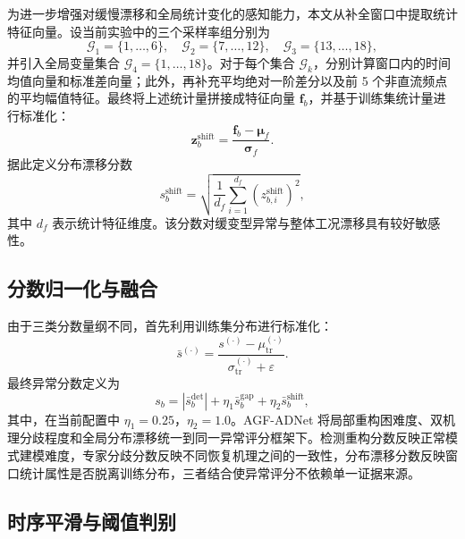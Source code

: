 \documentclass[bachelor, vlined]{DissertUESTC}
\begin{document}
    为进一步增强对缓慢漂移和全局统计变化的感知能力，本文从补全窗口中提取统计特征向量。设当前实验中的三个采样率组分别为
    \begin{equation}
        \mathcal{G}_1=\{1,\ldots,6\},\quad
        \mathcal{G}_2=\{7,\ldots,12\},\quad
        \mathcal{G}_3=\{13,\ldots,18\},
    \end{equation}
    并引入全局变量集合 $\mathcal{G}_4=\{1,\ldots,18\}$。对于每个集合 $\mathcal{G}_k$，分别计算窗口内的时间均值向量和标准差向量；此外，再补充平均绝对一阶差分以及前 5 个非直流频点的平均幅值特征。最终将上述统计量拼接成特征向量 $\mathbf{f}_b$，并基于训练集统计量进行标准化：
    \begin{equation}
        \mathbf{z}_b^{\mathrm{shift}} = \frac{\mathbf{f}_b-\boldsymbol{\mu}_f}{\boldsymbol{\sigma}_f}.
    \end{equation}
    据此定义分布漂移分数
    \begin{equation}
        s_b^{\mathrm{shift}}
        =
        \sqrt{
            \frac{1}{d_f}
            \sum_{i=1}^{d_f}
            \left(z_{b,i}^{\mathrm{shift}}\right)^2
        },
    \end{equation}
    其中 $d_f$ 表示统计特征维度。该分数对缓变型异常与整体工况漂移具有较好敏感性。
    
    \subsection{分数归一化与融合}
    
    由于三类分数量纲不同，首先利用训练集分布进行标准化：
    \begin{equation}
        \bar{s}^{(\cdot)} = \frac{s^{(\cdot)}-\mu^{(\cdot)}_{\mathrm{tr}}}{\sigma^{(\cdot)}_{\mathrm{tr}} + \varepsilon}.
    \end{equation}
    最终异常分数定义为
    \begin{equation}
        s_b
        =
        \left|\bar{s}_b^{\mathrm{det}}\right|
        +
        \eta_1 \bar{s}_b^{\mathrm{gap}}
        +
        \eta_2 \bar{s}_b^{\mathrm{shift}},
    \end{equation}
    其中，在当前配置中 $\eta_1=0.25$，$\eta_2=1.0$。AGF-ADNet 将局部重构困难度、双机理分歧程度和全局分布漂移统一到同一异常评分框架下。检测重构分数反映正常模式建模难度，专家分歧分数反映不同恢复机理之间的一致性，分布漂移分数反映窗口统计属性是否脱离训练分布，三者结合使异常评分不依赖单一证据来源。
    
    \subsection{时序平滑与阈值判别}
    
\end{document}
